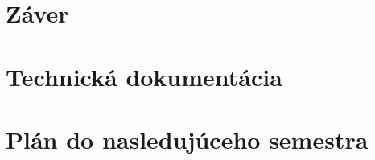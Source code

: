 \documentclass[a4paper,slovak,12pt,appendix]{article}
\begin{document}
\newpage
\section{Záver}

\newpage
\section{Technická dokumentácia}

\newpage
\section{Plán do nasledujúceho semestra}


\newpage
{}


\end{document}
